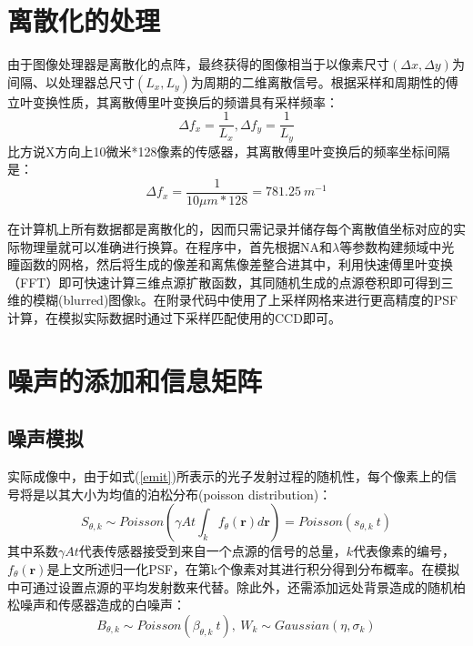 \documentclass[draft=false,oneside]{fduthesis}
\begin{document}
    
    \section{离散化的处理}
    由于图像处理器是离散化的点阵，最终获得的图像相当于以像素尺寸$(\Delta x,\Delta y)$为间隔、以处理器总尺寸$(L_x, L_y)$为周期的二维离散信号。根据采样和周期性的傅立叶变换性质，其离散傅里叶变换后的频谱具有采样频率：
    \begin{equation}
        \Delta f_x=\frac{1}{L_x},\Delta f_y=\frac{1}{L_y}
    \end{equation}
    比方说X方向上10微米*128像素的传感器，其离散傅里叶变换后的频率坐标间隔是：
    \begin{equation}
        \Delta f_x=\frac{1}{10\mu m*128}=781.25 \ m^{-1}
    \end{equation}
    \par 在计算机上所有数据都是离散化的，因而只需记录并储存每个离散值坐标对应的实际物理量就可以准确进行换算。在程序中，首先根据NA和$\lambda$等参数构建频域中光瞳函数的网格，然后将生成的像差和离焦像差整合进其中，利用快速傅里叶变换（FFT）即可快速计算三维点源扩散函数，其同随机生成的点源卷积即可得到三维的模糊(blurred)图像k。在附录代码中使用了上采样网格来进行更高精度的PSF计算，在模拟实际数据时通过下采样匹配使用的CCD即可。

    \section{噪声的添加和信息矩阵}
    \subsection{噪声模拟}
    实际成像中，由于如式(\ref{emit})所表示的光子发射过程的随机性，每个像素上的信号将是以其大小为均值的泊松分布(poisson distribution)：
    \begin{equation}
        S_{\theta,k}\sim Poisson(\gamma At\int_kf_{\theta}(\textbf{r})d\textbf{r})=Poisson(s_{\theta,k}\ t)
    \end{equation}
    其中系数$\gamma At$代表传感器接受到来自一个点源的信号的总量，$k$代表像素的编号，$f_{\theta}(\textbf{r})$是上文所述归一化PSF，在第k个像素对其进行积分得到分布概率。在模拟中可通过设置点源的平均发射数来代替。除此外，还需添加远处背景造成的随机柏松噪声和传感器造成的白噪声：
    \begin{equation}
        B_{\theta,k} \sim Poisson(\beta_{\theta,k}\ t) , \ W_{k} \sim Gaussian(\eta,\sigma_k)
    \end{equation}
\end{document}
